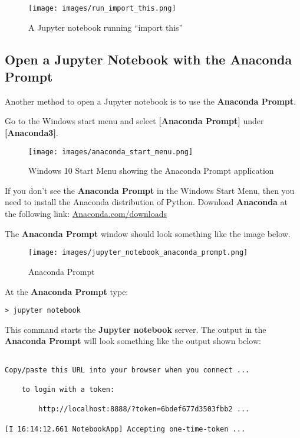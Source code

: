 \documentclass{book}
\makeatletter
\def\maxwidth{\ifdim\Gin@nat@width>\linewidth\linewidth
\else\Gin@nat@width\fi}
\let\Oldincludegraphics\includegraphics
\renewcommand{\includegraphics}[1]{\Oldincludegraphics[width=.8\maxwidth]{#1}}
\makeatother
\begin{document}
\begin{figure}
\centering
\texttt{[image: images/run\_import\_this.png]}
\caption{A Jupyter notebook running ``import this''}
\end{figure}
    




    
        \hypertarget{open-a-jupyter-notebook-with-the-anaconda-prompt}{%
\subsection{Open a Jupyter Notebook with the Anaconda
Prompt}\label{open-a-jupyter-notebook-with-the-anaconda-prompt}}
    




    
        Another method to open a Jupyter notebook is to use the \textbf{Anaconda
Prompt}.

Go to the Windows start menu and select \textbf{{[}Anaconda Prompt{]}}
under \textbf{{[}Anaconda3{]}}.

\begin{figure}
\centering
\texttt{[image: images/anaconda\_start\_menu.png]}
\caption{Windows 10 Start Menu showing the Anaconda Prompt application}
\end{figure}

If you don't see the \textbf{Anaconda Prompt} in the Windows Start Menu,
then you need to install the Anaconda distribution of Python. Download
\textbf{Anaconda} at the following link:
\href{https://www.anaconda.com/download/}{Anaconda.com/downloads}

The \textbf{Anaconda Prompt} window should look something like the image
below.

\begin{figure}
\centering
\texttt{[image: images/jupyter\_notebook\_anaconda\_prompt.png]}
\caption{Anaconda Prompt}
\end{figure}

At the \textbf{Anaconda Prompt} type:

\begin{lstlisting}
> jupyter notebook
\end{lstlisting}

This command starts the \textbf{Jupyter notebook} server. The output in
the \textbf{Anaconda Prompt} will look something like the output shown
below:

\begin{lstlisting}

Copy/paste this URL into your browser when you connect ...

    to login with a token:

        http://localhost:8888/?token=6bdef677d3503fbb2 ...

[I 16:14:12.661 NotebookApp] Accepting one-time-token ...
\end{lstlisting}
\end{document}
